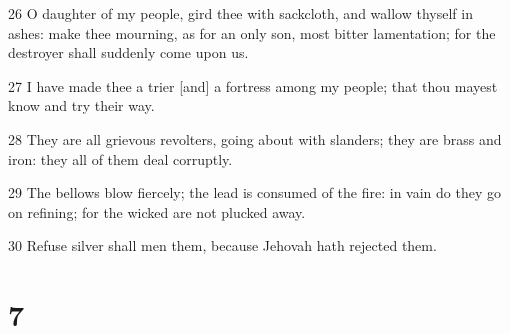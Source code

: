 \par 26 O daughter of my people, gird thee with sackcloth, and wallow thyself in ashes: make thee mourning, as for an only son, most bitter lamentation; for the destroyer shall suddenly come upon us.
\par 27 I have made thee a trier [and] a fortress among my people; that thou mayest know and try their way.
\par 28 They are all grievous revolters, going about with slanders; they are brass and iron: they all of them deal corruptly.
\par 29 The bellows blow fiercely; the lead is consumed of the fire: in vain do they go on refining; for the wicked are not plucked away.
\par 30 Refuse silver shall men them, because Jehovah hath rejected them.

\chapter{7}

